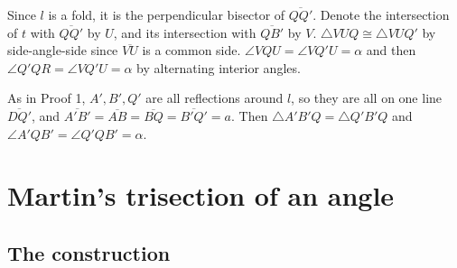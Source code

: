 Since $l$ is a fold, it is the perpendicular bisector of $\overline{QQ'}$. Denote the intersection of $t$ with $\overline{QQ'}$ by $U$, and its intersection with $\overline{QB'}$ by $V$. $\triangle VUQ\cong \triangle VUQ'$ by side-angle-side since $\overline{VU}$ is a common side. $\angle VQU=\angle VQ'U=\alpha$ and then $\angle Q'QR=\angle VQ'U=\alpha$ by alternating interior angles.

As in Proof 1, $A', B', Q'$ are all reflections around $l$, so they are all on one line $\overline{DQ'}$, and $\overline{A'B'}=\overline{AB}=\overline{BQ}=\overline{B'Q'}=a$. Then $\triangle A'B'Q=\triangle Q'B'Q$ and $\angle A'QB'=\angle Q'QB'=\alpha$.


\newpage

\section{Martin's trisection of an angle}\label{s.tri2}

\subsection{The construction}

